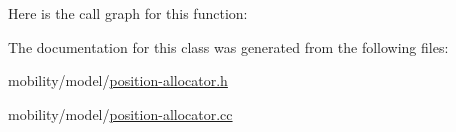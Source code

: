 Here is the call graph for this function\+:




The documentation for this class was generated from the following files\+:\begin{DoxyCompactItemize}
\item 
mobility/model/\hyperlink{position-allocator_8h}{position-\/allocator.\+h}\item 
mobility/model/\hyperlink{position-allocator_8cc}{position-\/allocator.\+cc}\end{DoxyCompactItemize}
